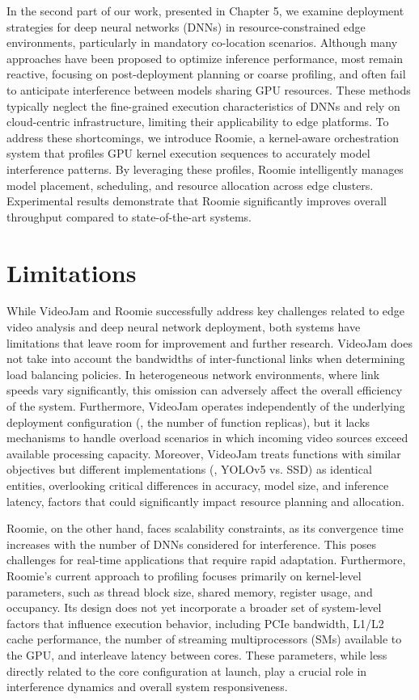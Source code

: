 In the second part of our work, presented in Chapter 5, we examine deployment strategies for deep neural networks (DNNs) in resource-constrained edge environments, particularly in mandatory co-location scenarios. Although many approaches have been proposed to optimize inference performance, most remain reactive, focusing on post-deployment planning or coarse profiling, and often fail to anticipate interference between models sharing GPU resources. These methods typically neglect the fine-grained execution characteristics of DNNs and rely on cloud-centric infrastructure, limiting their applicability to edge platforms. To address these shortcomings, we introduce Roomie, a kernel-aware orchestration system that profiles GPU kernel execution sequences to accurately model interference patterns. By leveraging these profiles, Roomie intelligently manages model placement, scheduling, and resource allocation across edge clusters. Experimental results demonstrate that Roomie significantly improves overall throughput compared to state-of-the-art systems.

\section{Limitations}

While VideoJam and Roomie successfully address key challenges related to edge video analysis and deep neural network deployment, both systems have limitations that leave room for improvement and further research.
VideoJam does not take into account the bandwidths of inter-functional links when determining load balancing policies. In heterogeneous network environments, where link speeds vary significantly, this omission can adversely affect the overall efficiency of the system. Furthermore, VideoJam operates independently of the underlying deployment configuration (\eg, the number of function replicas), but it lacks mechanisms to handle overload scenarios in which incoming video sources exceed available processing capacity. Moreover, VideoJam treats functions with similar objectives but different implementations (\eg, YOLOv5 vs. SSD) as identical entities, overlooking critical differences in accuracy, model size, and inference latency, factors that could significantly impact resource planning and allocation.

Roomie, on the other hand, faces scalability constraints, as its convergence time increases with the number of DNNs considered for interference. This poses challenges for real-time applications that require rapid adaptation. Furthermore, Roomie's current approach to profiling focuses primarily on kernel-level parameters, such as thread block size, shared memory, register usage, and occupancy. Its design does not yet incorporate a broader set of system-level factors that influence execution behavior, including PCIe bandwidth, L1/L2 cache performance, the number of streaming multiprocessors (SMs) available to the GPU, and interleave latency between cores. These parameters, while less directly related to the core configuration at launch, play a crucial role in interference dynamics and overall system responsiveness.


